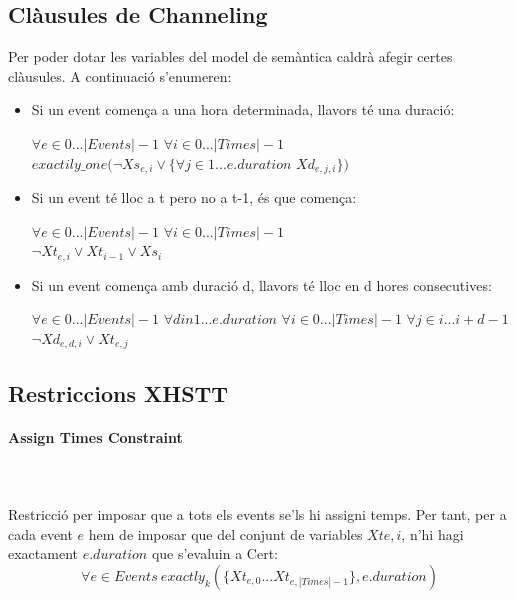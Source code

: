 \documentclass[11pt,a4paper,twoside]{report}
\begin{document}
  \subsection{Clàusules de Channeling}

  Per poder dotar les variables del model de semàntica caldrà afegir certes clàusules. A continuació s'enumeren:
  \begin{itemize}
    \item Si un event comença a una hora determinada, llavors té una duració: \begin{center} $\forall e \in 0 ... |Events|-1$ $\forall i \in 0 ... |Times|-1$ \\$exactily\_one(\neg Xs_{e,i} \vee \{ \forall j \in 1 ... e.duration$ $Xd_{e,j,i}\})$\end{center}
    \item Si un event té lloc a t pero no a t-1, és que comença: \begin{center} $\forall e \in 0 ... |Events|-1$ $\forall i \in 0 ... |Times|-1$ \\$\neg Xt_{e,i} \vee Xt_{i-1} \vee Xs_i$ \end{center}
    \item Si un event comença amb duració d, llavors té lloc en d hores consecutives: \begin{center} 
      $\forall e \in 0 ... |Events|-1$ $\forall d in 1 ... e.duration$ $\forall i \in 0 ... |Times|-1$ $\forall j \in i ... i+d-1$ \\
      $\neg Xd_{e,d,i} \vee Xt_{e,j}$
    
    \end{center}
  \end{itemize}

  \subsection{Restriccions XHSTT}
  \paragraph*{Assign Times Constraint} ~\\~\\
  Restricció per imposar que a tots els events se'ls hi assigni temps. Per tant, per a cada event $e$ hem de imposar que del conjunt de variables $Xt{e,i}$, n'hi hagi exactament $e.duration$ que s'evaluin a Cert:
  \[
    \forall e \in Events \ exactly_k(\{Xt_{e,0} ... Xt_{e,|Times|-1}\}, e.duration)
  \]
\end{document}
